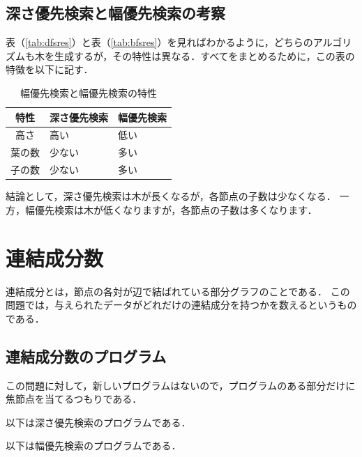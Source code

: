 \documentclass[a4j, titlepage]{jarticle}
\begin{document}
    \subsection{深さ優先検索と幅優先検索の考察}
    表（\ref{tab:dfsres}）と表（\ref{tab:bfsres}）を見ればわかるように，どちらのアルゴリズムも木を生成するが，その特性は異なる．すべてをまとめるために，この表の特徴を以下に記す．

    \begin{longtable}[c]{|c|l|l|}
        \caption{幅優先検索と幅優先検索の特性}
        \label{tab:characteristic}\\
        \hline
        \rowcolor[HTML]{C0C0C0} 
        \cellcolor[HTML]{C0C0C0}特性 & \multicolumn{1}{c|}{\cellcolor[HTML]{C0C0C0}深さ優先検索} & \multicolumn{1}{c|}{\cellcolor[HTML]{C0C0C0}幅優先検索} \\ \hline
        \endfirsthead
        \endhead
        高さ        & 高い    & 低い          \\ \hline
        葉の数       & 少ない   & 多い          \\ \hline
        子の数       & 少ない   & 多い          \\ \hline
    \end{longtable}

    結論として，深さ優先検索は木が長くなるが，各節点の子数は少なくなる．
    一方，幅優先検索は木が低くなりますが，各節点の子数は多くなります．

\vspace{30pt}
    
\section{連結成分数}
連結成分とは，節点の各対が辺で結ばれている部分グラフのことである．
この問題では，与えられたデータがどれだけの連結成分を持つかを数えるというものである．
    
    \subsection{連結成分数のプログラム}
    この問題に対して，新しいプログラムはないので，プログラムのある部分だけに焦節点を当てるつもりである．

    以下は深さ優先検索のプログラムである．
     

    以下は幅優先検索のプログラムである．
     
    
\end{document}
